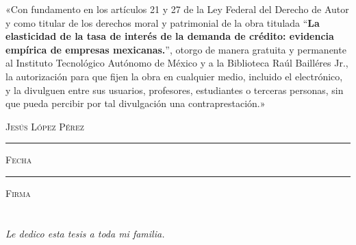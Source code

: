 \documentclass[11pt, oneside]{book}
\begin{document}

\thispagestyle{empty}

\vspace*{\fill}
\begingroup

\noindent
«Con fundamento en los artículos 21 y 27 de la Ley Federal del Derecho de Autor y como titular de los derechos moral y patrimonial de la obra titulada ``\textbf{La elasticidad de la tasa de interés de la demanda de crédito: evidencia empírica de empresas mexicanas.}'', otorgo de manera gratuita y permanente al Instituto Tecnológico Autónomo de México y a la Biblioteca Raúl Bailléres Jr., la autorización para que fijen la obra en cualquier medio, incluido el electrónico, y la divulguen entre sus usuarios, profesores, estudiantes o terceras personas, sin que pueda percibir por tal divulgación una contraprestación.»


\centering 

\vspace{5em}


\textsc{Jesús López Pérez}
 
\vspace{5em}

\rule[1em]{20em}{0.5pt} %

\textsc{Fecha}

\vspace{5em}
\rule[1em]{20em}{0.5pt} %

\textsc{Firma}


\endgroup
\vspace*{\fill}


\pagestyle{plain}
\frontmatter

\chapter*{}
\begin{flushright}
\noindent \textit{Le dedico esta tesis a toda mi familia.}
\end{flushright}
\end{document}
